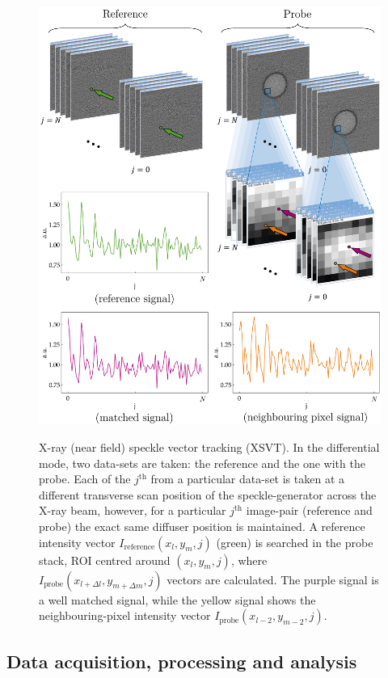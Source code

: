 \begin{refsection}
\begin{figure}[t]
        \centering
        {\includegraphics[width=.7\linewidth]{figures/ch04/speckle_data.pdf}}
        \caption[X-ray (near field) speckle vector tracking (XSVT)]{X-ray (near field) speckle vector tracking (XSVT). In the differential mode, two data-sets are taken: the reference and the one with the probe. Each of the $j^\text{th}$ from a particular data-set is taken at a different transverse scan position of the speckle-generator across the X-ray beam, however, for a particular $j^\text{th}$ image-pair
        (reference and probe) the exact same diffuser position is maintained. A reference intensity vector $I_{\text{reference}}(x_l,y_m,j)$ (green) is searched in the probe stack, ROI centred around $(x_l,y_m,j)$, where $I_{\text{probe}}(x_{l+\Delta l},y_{m+\Delta m},j)$ vectors are calculated. The purple signal is a well matched signal, while the yellow signal shows the neighbouring-pixel intensity vector $I_{\text{probe}}(x_{l-2},y_{m-2},j)$.}\label{fig:data_tracking}
\end{figure}


\subsection{Data acquisition, processing and analysis}\label{sec:data}


\end{refsection}
